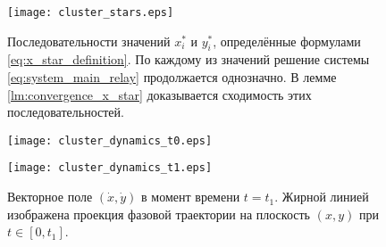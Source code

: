 \begin{figure}
	\centering
	\texttt{[image: cluster\_stars.eps]}
	\caption{Последовательности значений $x^*_i$ и $y^*_i$, определённые формулами \eqref{eq:x_star_definition}. По каждому из значений решение системы \eqref{eq:system_main_relay} продолжается однозначно. В лемме \ref{lm:convergence_x_star} доказывается сходимость этих последовательностей.}
	\label{fig:x_star}
\end{figure}

\begin{figure}
	\begin{minipage}{0.48\textwidth}
		\centering
		\texttt{[image: cluster\_dynamics\_t0.eps]}
		\captionsetup{width=0.9\textwidth} 
		\caption{Векторное поле $(\dot{x}, \dot{y})$ в момент времени $t = t_0$. Жирной линией изображена проекция фазовой траектории на плоскость $(x, y)$ при $t \in [0, t_0]$. %
		}
		\label{fig:dynamics_t0}
	\end{minipage}\hfill
	\begin{minipage}{0.48\textwidth}
		\centering
		\texttt{[image: cluster\_dynamics\_t1.eps]}
		\captionsetup{width=0.9\textwidth} 
		\caption{Векторное поле $(\dot{x}, \dot{y})$ в момент времени $t = t_1$. Жирной линией изображена проекция фазовой траектории на плоскость $(x, y)$ при $t \in [0, t_1]$.}
		\label{fig:dynamics_t1}
	\end{minipage}
\end{figure}

